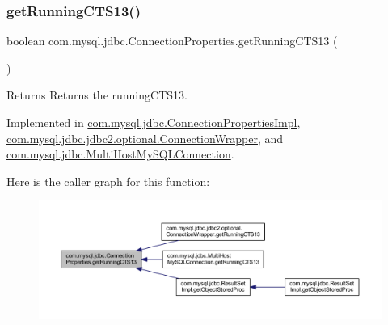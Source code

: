 \subsubsection{\texorpdfstring{get\+Running\+C\+T\+S13()}{getRunningCTS13()}}
{\footnotesize\ttfamily boolean com.\+mysql.\+jdbc.\+Connection\+Properties.\+get\+Running\+C\+T\+S13 (\begin{DoxyParamCaption}{ }\end{DoxyParamCaption})}

\begin{DoxyReturn}{Returns}
Returns the running\+C\+T\+S13. 
\end{DoxyReturn}


Implemented in \mbox{\hyperlink{classcom_1_1mysql_1_1jdbc_1_1_connection_properties_impl_ae79ee1ae8f46db9eaa32d5e01c2d4a6a}{com.\+mysql.\+jdbc.\+Connection\+Properties\+Impl}}, \mbox{\hyperlink{classcom_1_1mysql_1_1jdbc_1_1jdbc2_1_1optional_1_1_connection_wrapper_a36c11c49d3f4edb4131bef69c53e8141}{com.\+mysql.\+jdbc.\+jdbc2.\+optional.\+Connection\+Wrapper}}, and \mbox{\hyperlink{classcom_1_1mysql_1_1jdbc_1_1_multi_host_my_s_q_l_connection_a560585155115e4a2a82356fffe5fc672}{com.\+mysql.\+jdbc.\+Multi\+Host\+My\+S\+Q\+L\+Connection}}.

Here is the caller graph for this function\+:\nopagebreak
\begin{figure}[H]
\begin{center}
\leavevmode
\includegraphics[width=350pt]{interfacecom_1_1mysql_1_1jdbc_1_1_connection_properties_ac861d675728756c06dd2984057b95ab6_icgraph}
\end{center}
\end{figure}
\mbox{\label{interfacecom_1_1mysql_1_1jdbc_1_1_connection_properties_a488c241668bba62e720eea31fde52512}} 
